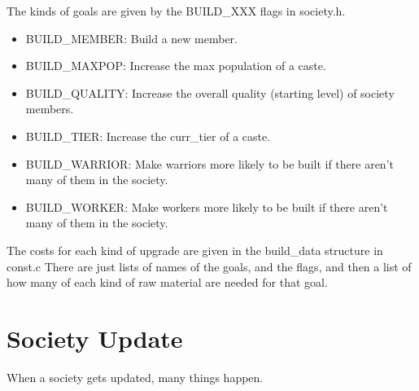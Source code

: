 The kinds of goals are given by the BUILD\_XXX flags in society.h.

\begin{itemize}

\item BUILD\_MEMBER: Build a new member.

\item BUILD\_MAXPOP: Increase the max population of a caste.

\item BUILD\_QUALITY: Increase the overall quality (starting level) of society
  members.

\item BUILD\_TIER: Increase the curr\_tier of a caste.

\item BUILD\_WARRIOR: Make warriors more likely to be built if there
aren't many of them in the society.

\item BUILD\_WORKER: Make workers more likely to be built if there 
aren't many of them in the society.

\end{itemize}

The costs for each kind of upgrade are given in the build\_data
structure in const.c There are just lists of names of the
goals, and the flags, and then a list of how many of each kind of
raw material are needed for that goal.
  

\section{Society Update}

When a society gets updated, many things happen.

